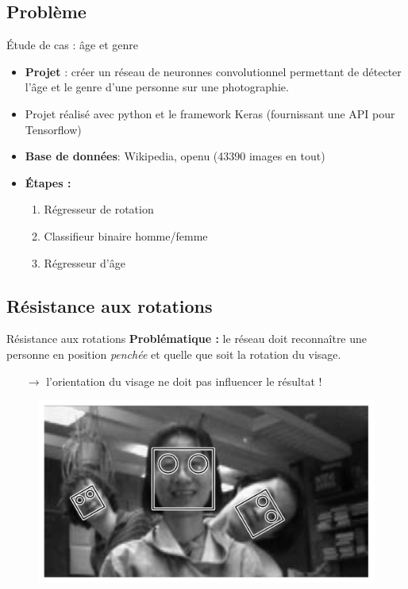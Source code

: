\documentclass[compress]{beamer}
\begin{document}
\subsection{Problème}
\begin{frame}{\'Etude de cas : âge et genre}
  \begin{itemize}
    \item
    \textbf{\color{fibeamer@orange}Projet} : créer un réseau de neuronnes convolutionnel
    permettant de détecter l'{\color{fibeamer@orange}âge} et le {\color{fibeamer@orange}genre} d'une personne sur une photographie.
    \item Projet réalisé avec python et le framework Keras (fournissant une API pour Tensorflow)
    \item \textbf{\color{fibeamer@orange}Base de données}: Wikipedia, openu (43390 images en tout)
    \item \textbf{\color{fibeamer@orange}\'Etapes :}
    \begin{enumerate}
      \item Régresseur de rotation
      \item Classifieur binaire homme/femme
      \item Régresseur d'âge
    \end{enumerate}
  \end{itemize}
\end{frame}
\subsection{Résistance aux rotations}

\begin{frame}{Résistance aux rotations}
  \textbf{\color{fibeamer@orange}Problématique :} le réseau doit reconnaître une personne en position \textit{penchée} et quelle que soit la rotation du visage.
  \begin{itemize}
    \item[$\rightarrow$] l'orientation du visage ne doit pas influencer le résultat !
  \end{itemize}
  \vspace{-.03\linewidth}
  \begin{figure}
    \includegraphics[width=0.8\linewidth]{resources/rotation2}
  \end{figure}
\end{frame}
\end{document}
